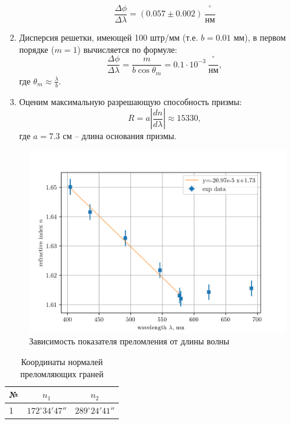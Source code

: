 \documentclass[12pt]{article}
\begin{document}
\begin{enumerate}
        \[\frac{\Delta \phi}{\Delta \lambda} = (0.057 \pm 0.002)\ \frac{^{\circ}}{\text{нм}}\]
        \item Дисперсия решетки, имеющей 100 штр/мм (т.е. $b = 0.01$ мм), в первом порядке ($m = 1$)
        вычисляется по формуле:
        \[\frac{\Delta \phi}{\Delta \lambda} = \frac{m}{b \cos\theta_m} = 0.1 \cdot 10^{-3}\ \frac{^{\circ}}{\text{нм}},\]
        где $\theta_m \approx \frac{\lambda}{b}$.
        \item Оценим максимальную разрешающую способность призмы:
        \[R = a \left|\frac{dn}{d\lambda}\right| \approx 15330,\]
        где $a = 7.3$ см -- длина основания призмы.
    \end{enumerate}

    \begin{figure}
        \centering
        \includegraphics[width=0.8\linewidth]{pic/n(lmbd)}
        \caption{Зависимость показателя преломления от длины волны}
        \label{fig:fig3}
    \end{figure}


    \begin{table}
        \centering
        \caption{Координаты нормалей преломляющих граней}
        \label{tab:tab1}
        \begin{tabular}{|l|c|c|}
            \hline
            № & $n_1$                & $n_2$                \\\hline
            1 & $172^{\circ}34'47''$ & $289^{\circ}24'41''$ \\
            \hline
        \end{tabular}
    \end{table}
\end{document}
